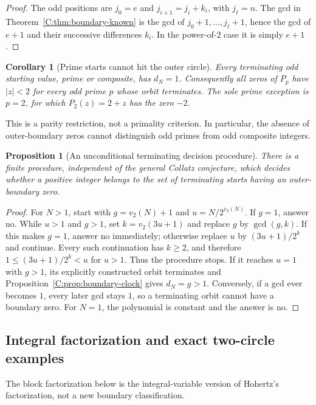 \documentclass[11pt,a4paper]{article}
\newtheorem{proposition}[theorem]{Proposition}
\newtheorem{corollary}[theorem]{Corollary}
\theoremstyle{definition}
\theoremstyle{remark}
\numberwithin{equation}{section}
\begin{document}
\begin{proof}
The odd positions are $j_0=e$ and
$j_{i+1}=j_i+k_i$, with $j_\ell=n$. The gcd in
Theorem~\ref{C:thm:boundary-known} is the gcd of
$j_0+1,\ldots,j_\ell+1$, hence the gcd of $e+1$ and their successive
differences $k_i$. In the power-of-$2$ case it is simply $e+1$.
\end{proof}

\begin{corollary}[Prime starts cannot hit the outer circle]
Every terminating odd starting value, prime or composite, has $d_N=1$.
Consequently all zeros of $P_p$ have $|z|<2$ for every odd prime $p$
whose orbit terminates. The sole prime exception is $p=2$, for which
$P_2(z)=2+z$ has the zero $-2$.
\end{corollary}

This is a parity restriction, not a primality criterion. In particular,
the absence of outer-boundary zeros cannot distinguish odd primes from
odd composite integers.

\begin{proposition}[An unconditional terminating decision procedure]
There is a finite procedure, independent of the general Collatz conjecture,
which decides whether a positive integer belongs to the set of terminating
starts having an outer-boundary zero.
\end{proposition}

\begin{proof}
For $N>1$, start with $g=v_2(N)+1$ and $u=N/2^{v_2(N)}$.
If $g=1$, answer no. While $u>1$ and $g>1$, set
$k=v_2(3u+1)$ and replace $g$ by $\gcd(g,k)$.
If this makes $g=1$, answer no immediately; otherwise replace
$u$ by $(3u+1)/2^k$ and continue. Every such continuation has
$k\ge2$, and therefore $1\le(3u+1)/2^k<u$ for $u>1$.
Thus the procedure stops. If it reaches $u=1$ with $g>1$, its explicitly
constructed orbit terminates and Proposition~\ref{C:prop:boundary-clock}
gives $d_N=g>1$. Conversely, if a gcd ever becomes $1$, every later gcd
stays $1$, so a terminating orbit cannot have a boundary zero.
For $N=1$, the polynomial is constant and the answer is no.
\end{proof}

\subsection{Integral factorization and exact two-circle examples}
The block factorization below is the integral-variable version of
Hohertz's factorization, not a new boundary classification.
\end{document}
